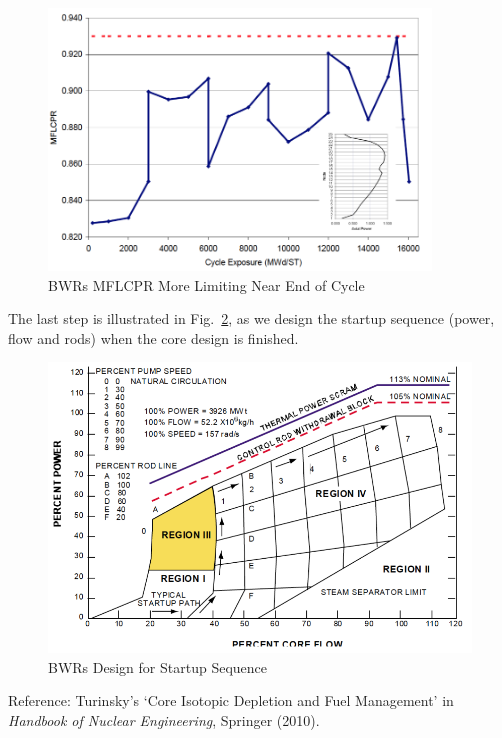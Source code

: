 \documentclass{school-22.211-notes}
\begin{document}
\begin{enumerate}
  \begin{figure}[ht]
    \centering
    \includegraphics[width=4in]{images/design/BWR-limiting-end.png}
    \caption{BWRs MFLCPR More Limiting Near End of Cycle} \label{BWR-end} 
    \end{figure}
\end{enumerate}



The last step is illustrated in Fig.~\ref{BWR-startup}, as we design the startup sequence (power, flow and rods) when the core design is finished.
  \begin{figure}[ht]
    \centering
    \includegraphics[width=6in]{images/design/BWR-startup-seq.png}
    \caption{BWRs Design for Startup Sequence} \label{BWR-startup} 
    \end{figure}

\clearpage
{}
Reference: Turinsky's `Core Isotopic Depletion and Fuel Management' in \textit{Handbook of Nuclear Engineering}, Springer (2010). 
\end{document}
